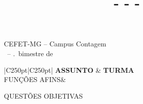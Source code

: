 \documentclass[a4paper,12pt]{article}
\title{\titulo \-- \assunto \-- \turma \-- \numProva}
\author{\professor}
\date{\data}
\newcommand{\assunto}{FUNÇÕES AFINS}
\begin{document}
    \NoBgThispage
        
    
    \newpage
        
        
    \NoBgThispage
        
    \begin{center}
        CEFET-MG -- Campus Contagem \\[3pt]
        \titulo\ -- \bimestre.\textordmasculine\ bimestre de \ano \\[3pt]
        \professor
    \end{center}
    
    \begin{center}
        \vspace{15pt}
        \begin{tabular}{|C{250pt}|C{250pt}|}
            \hline
            \textbf{ASSUNTO} &
            \textbf{TURMA} \\
            \hline
            \assunto & \turma \\
            \hline
        \end{tabular}
    \end{center}
        
    \begin{center}
        QUESTÕES OBJETIVAS
    \end{center}
    
    \vspace{15pt}
    \newcommand{\modo}{objetivo} %
    
    
    \vspace{15pt}
    
    
    \vspace{15pt}
    
    
    \vspace{15pt}
    
    
    \vspace{15pt}
    
\end{document}
